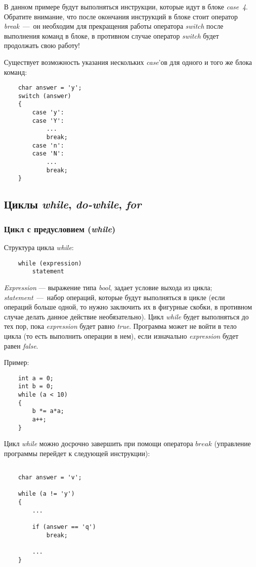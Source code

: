 В данном примере будут выполняться инструкции, которые идут в блоке \textit{case~4}. Обратите внимание, что после окончания инструкций в блоке стоит оператор \textit{break}~---~он необходим для прекращения работы оператора \textit{switch} после выполнения команд в блоке, в противном случае оператор \textit{switch} будет продолжать свою работу!

Существует возможность указания нескольких \textit{case}'ов для одного и того же блока команд:

\begin{lstlisting}
    char answer = 'y';
    switch (answer)
    {
        case 'y':
        case 'Y':
            ...
            break;
        case 'n':
        case 'N':
            ...
            break;
    }
\end{lstlisting}

\subsection{Циклы \textit{while}, \textit{do-while}, \textit{for}}
\subsubsection{Цикл с предусловием (\textit{while})}
Структура цикла \textit{while}:
\begin{lstlisting}
    while (expression)
        statement
\end{lstlisting}

\textit{Expression} --- выражение типа \textit{bool}, задает условие выхода из цикла; \textit{statement}~---~набор операций, которые будут выполняться в цикле (если операций больше одной, то нужно заключить их в фигурные скобки, в противном случае делать данное действие необязательно). Цикл \textit{while} будет выполняться до тех пор, пока \textit{expression} будет равно \textit{true}. Программа может не войти в тело цикла (то есть выполнить операции в нем), если изначально \textit{expression} будет равен \textit{false}.

Пример:

\begin{lstlisting}
    int a = 0;
    int b = 0;
    while (a < 10)
    {
        b *= a*a;
        a++;
    }
\end{lstlisting}

Цикл \textit{while} можно досрочно завершить при помощи оператора $break$ (управление программы перейдет к следующей инструкции):

\begin{lstlisting}

    char answer = 'v';

    while (a != 'y')
    {
        ...

        if (answer == 'q')
            break;

        ...
    }

\end{lstlisting}

